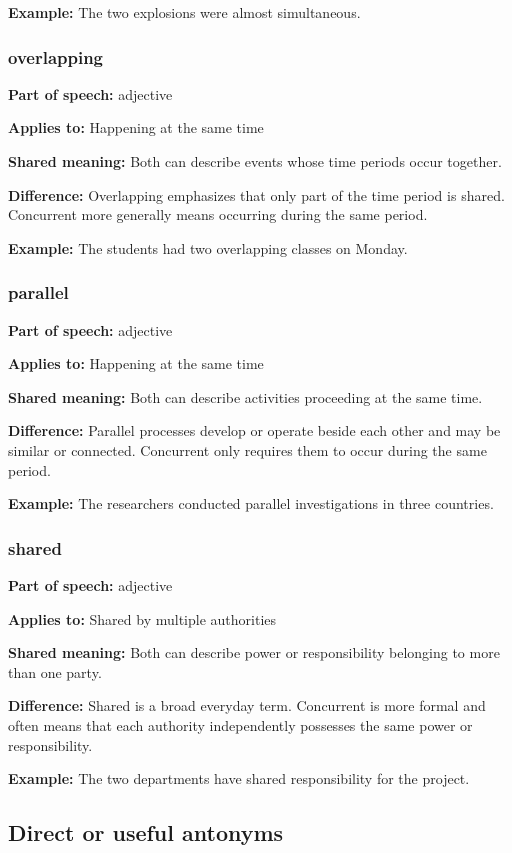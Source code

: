 \documentclass[11pt]{article}
\begin{document}
\textbf{Example:} The two explosions were almost simultaneous.

\subsubsection{overlapping}
\textbf{Part of speech:} adjective

\textbf{Applies to:} Happening at the same time

\textbf{Shared meaning:} Both can describe events whose time periods occur together.

\textbf{Difference:} Overlapping emphasizes that only part of the time period is shared. Concurrent more generally means occurring during the same period.

\textbf{Example:} The students had two overlapping classes on Monday.

\subsubsection{parallel}
\textbf{Part of speech:} adjective

\textbf{Applies to:} Happening at the same time

\textbf{Shared meaning:} Both can describe activities proceeding at the same time.

\textbf{Difference:} Parallel processes develop or operate beside each other and may be similar or connected. Concurrent only requires them to occur during the same period.

\textbf{Example:} The researchers conducted parallel investigations in three countries.

\subsubsection{shared}
\textbf{Part of speech:} adjective

\textbf{Applies to:} Shared by multiple authorities

\textbf{Shared meaning:} Both can describe power or responsibility belonging to more than one party.

\textbf{Difference:} Shared is a broad everyday term. Concurrent is more formal and often means that each authority independently possesses the same power or responsibility.

\textbf{Example:} The two departments have shared responsibility for the project.

\subsection{Direct or useful antonyms}
\end{document}
